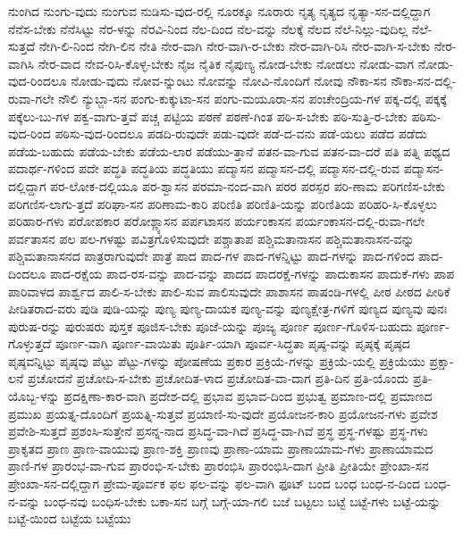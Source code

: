 {ನುಂಗಿದ
ನುಂಗು-ವುದು
ನುಂಗುವ
ನುಡಿಸು-ವುದ-ರಲ್ಲಿ
ನೂರಕ್ಕೂ
ನೂರಾರು
ನೃತ್ಯ
ನೃತ್ಯದ
ನೃತ್ಯಾ-ಸನ-ದಲ್ಲಿದ್ದಾಗ
ನೆನೆಸ-ಬೇಕು
ನೆನೆಸಿಟ್ಟು
ನೆರ-ಳನ್ನು
ನೆರವಿ-ನಿಂದ
ನೆಲ-ದಿಂದ
ನೆಲ-ವನ್ನು
ನೆಲಕ್ಕೆ
ನೆಲದ
ನೆಲೆ-ನಿಲ್ಲು-ವುದಿಲ್ಲ
ನೆಲೆ-ಸುತ್ತದೆ
ನೇಗಿ-ಲಿ-ನಿಂದ
ನೇಗಿ-ಲಿನ
ನೇತಿ
ನೇರ-ವಾಗಿ
ನೇರ-ವಾಗಿ-ರ-ಬೇಕು
ನೇರ-ವಾಗಿ-ರಿಸಿ
ನೇರ-ವಾಗಿ-ಸ-ಬೇಕು
ನೇರ-ವಾಗಿಸಿ
ನೇರ-ವಾದ
ನೇವ-ರಿಸಿ-ಕೊಳ್ಳ-ಬೇಕು
ನೈಜ
ನೈತಿಕ
ನೈಪುಣ್ಯ
ನೋಡ-ಬೇಕು
ನೋಡಲು
ನೋಡು-ವಾಗ
ನೋಡು-ವುದ-ರಿಂದಲೂ
ನೋಡು-ವುದು
ನೋವ-ನ್ನುಂಟು
ನೋವನ್ನು
ನೋವಿ-ನೊಂದಿಗೆ
ನೋವು
ನೌಕಾ-ಸನ
ನೌಕಾ-ಸನ-ದಲ್ಲಿ-ರುವಾ-ಗಲೇ
ನೌಲಿ
ನ್ಯುಬ್ಜಾ-ಸನ
ಪಂಗು-ಕುಕ್ಕುಟಾ-ಸನ
ಪಂಗು-ಮಯೂರಾ-ಸನ
ಪಂಚೇಂದ್ರಿಯ-ಗಳ
ಪಕ್ಕ-ದಲ್ಲಿ
ಪಕ್ಕಕ್ಕೆ
ಪಕ್ಕೆಲು-ಬು-ಗಳ
ಪಕ್ವ-ವಾಗು-ತ್ತವೆ
ಪಚ್ಚ
ಪಟ್ಟಿಯ
ಪಠಣೆ
ಪಠಣೆ-ಗಿಂತ
ಪಠಿ-ಸ-ಬೇಕು
ಪಠಿ-ಸುತ್ತಿ-ರ-ಬೇಕು
ಪಠಿಸು-ವುದ-ರಿಂದ
ಪಠಿಸು-ವುದ-ರಿಂದಲೂ
ಪಡದಿ-ರುವುದೇ
ಪಡು-ವುದೇ
ಪಡೆ-ದ-ವನು
ಪಡೆ-ಯಲು
ಪಡೆದ
ಪಡೆದು
ಪಡೆಯ-ಬಹುದು
ಪಡೆಯ-ಬೇಕು
ಪಡೆಯ-ಲಾರ
ಪಡೆಯು-ತ್ತಾನೆ
ಪತನ-ವಾ-ಗುವ
ಪತನ-ವಾ-ದರೆ
ಪತಿ
ಪತ್ನಿ
ಪಥ್ಯದ
ಪದಾರ್ಥ-ಗಳಿಂದ
ಪದೇ
ಪದ್ಧತಿ
ಪದ್ಧತಿಯ
ಪದ್ಧತಿಯು
ಪದ್ಮಾಸನ
ಪದ್ಮಾಸನ-ದಲ್ಲಿ
ಪದ್ಮಾಸನ-ದಲ್ಲಿ-ರುವ
ಪದ್ಮಾಸನ-ದಲ್ಲಿದ್ದಾಗ
ಪರ-ಲೋಕ-ದಲ್ಲಿಯೂ
ಪರ-ಶ್ವಾಸನ
ಪರಮಾ-ನಂದ-ವಾಗಿ
ಪರರ
ಪರಸ್ಪರ
ಪರಿ-ಣಾಮ
ಪರಿಗಣಿಸ-ಬೇಕು
ಪರಿಗಣಿಸ-ಲಾಗು-ತ್ತದೆ
ಪರಿಘಾ-ಸನ
ಪರಿಣಾಮ-ಕಾರಿ
ಪರಿಣಿತಿ
ಪರಿಣಿತಿ-ಯನ್ನು
ಪರಿಣಿತಿಯ
ಪರಿಹರಿ-ಸಿ-ಕೊಳ್ಳಲು
ಪರಿಹಾರ-ಗಳು
ಪರೋಪಕಾರ
ಪರೋಶ್ಣ್ಯಾಸನ
ಪರ್ಪಟಾಸನ
ಪರ್ಯಂಕಾಸನ
ಪರ್ಯಂಕಾಸನ-ದಲ್ಲಿ-ರುವಾ-ಗಲೇ
ಪರ್ವತಾಸನ
ಪಲ
ಪಲ-ಗಳಷ್ಟು
ಪವಿತ್ರಗೊಳಿಸುವುದೇ
ಪಶ್ಚಾತಾಪ
ಪಶ್ಚಿಮತಾನಾಸನ
ಪಶ್ಚಿಮತಾನಾಸನ-ವನ್ನು
ಪಶ್ಚಿಮತಾನಾಸನದ
ಪಾತ್ರರಾಗುವುದೇ
ಪಾತ್ರೆ
ಪಾದ
ಪಾದ-ಗಳ
ಪಾದ-ಗಳನ್ನಿಟ್ಟು
ಪಾದ-ಗಳನ್ನು
ಪಾದ-ಗಳಿಂದ
ಪಾದ-ದಿಂದಲೂ
ಪಾದ-ರಕ್ಷೆಯ
ಪಾದ-ರಸ-ವನ್ನು
ಪಾದ-ವನ್ನು
ಪಾದದ
ಪಾದರಕ್ಷೆ-ಗಳನ್ನು
ಪಾದುಕಾಸನ
ಪಾದುಕೆ-ಗಳು
ಪಾಪ
ಪಾರಿವಾಳದ
ಪಾರ್ಶ್ವದ
ಪಾಲಿ-ಸ-ಬೇಕು
ಪಾಲಿ-ಸುವ
ಪಾಲಿಸುವುದೇ
ಪಾಶಾಸನ
ಪಾಷಂಡಿ-ಗಳಲ್ಲಿ
ಪೀಠ
ಪೀಠದ
ಪೀಠಿಕೆ
ಪೀಡಿತರಾದ-ವರು
ಪುಡಿ
ಪುಡಿ-ಯನ್ನು
ಪುಣ್ಯ
ಪುಣ್ಯ-ದಾಯಕ
ಪುಣ್ಯ-ವನ್ನು
ಪುಣ್ಯಕ್ಷೇತ್ರ-ಗಳಿಗೆ
ಪುಣ್ಯದ
ಪುಣ್ಯವು
ಪುನಃ
ಪುರುಷ-ರನ್ನು
ಪುರುಷರು
ಪುಸ್ತಕ
ಪೂಜಿಸ-ಬೇಕು
ಪೂಜೆ-ಯನ್ನು
ಪೂಜ್ಯ
ಪೂರ್ಣ
ಪೂರ್ಣ-ಗೊಳಿಸ-ಬಹುದು
ಪೂರ್ಣ-ಗೊಳ್ಳುತ್ತದೆ
ಪೂರ್ಣ-ವಾಗಿ
ಪೂರ್ಣ-ವಾಯಿತು
ಪೂರ್ತಿ-ಯಾಗಿ
ಪೂರ್ವ-ಸಿದ್ಧತಾ
ಪೃಷ್ಠ-ವನ್ನು
ಪೃಷ್ಠಕ್ಕೆ
ಪೃಷ್ಠದ
ಪೃಷ್ಠವನ್ನಿಟ್ಟು
ಪೃಷ್ಠವು
ಪೆಟ್ಟು
ಪೆಟ್ಟು-ಗಳನ್ನು
ಪೋಷಣೆಯ
ಪ್ರಕಾರ
ಪ್ರಕ್ರಿಯೆ-ಗಳನ್ನು
ಪ್ರಕ್ರಿಯೆ-ಯಲ್ಲಿ
ಪ್ರಕ್ರಿಯೆಯು
ಪ್ರಕ್ಷಾ-ಲನೆ
ಪ್ರಚೋದನೆ
ಪ್ರಚೋದಿ-ಸ-ಬೇಕು
ಪ್ರಚೋದಿತ-ಳಾದ
ಪ್ರಚೋದಿತ-ವಾ-ದಾಗ
ಪ್ರತಿ-ದಿನ
ಪ್ರತಿ-ಯೊಂದು
ಪ್ರತಿ-ಯೊಬ್ಬ-ಳನ್ನು
ಪ್ರದಕ್ಷಿಣಾ-ಕಾರ-ವಾಗಿ
ಪ್ರದೇಶ-ದಲ್ಲಿ
ಪ್ರಭಾವ
ಪ್ರಭಾವ-ದಿಂದ
ಪ್ರಭುತ್ವ
ಪ್ರಮಾಣ-ದಲ್ಲಿ
ಪ್ರಮಾಣದ
ಪ್ರಮುಖ
ಪ್ರಯತ್ನ-ದೊಂದಿಗೆ
ಪ್ರಯತ್ನಿ-ಸುತ್ತವೆ
ಪ್ರಯಾಣಿ-ಸು-ವುದೇ
ಪ್ರಯೋಜನ-ಕಾರಿ
ಪ್ರಯೋಜನ-ಗಳು
ಪ್ರವೇಶ
ಪ್ರವೇಶಿ-ಸುತ್ತದೆ
ಪ್ರಶಂಸಿ-ಸುತ್ತೇನೆ
ಪ್ರಸನ್ನ-ನಾದ
ಪ್ರಸಿದ್ಧ-ವಾ-ಗಿದೆ
ಪ್ರಸಿದ್ಧ-ವಾ-ಗಿವೆ
ಪ್ರಸ್ಥ
ಪ್ರಸ್ಥ-ಗಳಷ್ಟು
ಪ್ರಸ್ಥ-ಗಳು
ಪ್ರಾಕೃತದ
ಪ್ರಾಣ
ಪ್ರಾಣ-ವಾಯುವು
ಪ್ರಾಣ-ಶಕ್ತಿ
ಪ್ರಾಣವು
ಪ್ರಾಣಾ-ಯಾಮ
ಪ್ರಾಣಾಯಾಮ-ಗಳು
ಪ್ರಾಣಾಯಾಮದ
ಪ್ರಾಣಿ-ಗಳ
ಪ್ರಾರಂಭ-ವಾ-ಗುವ
ಪ್ರಾರಂಭಿ-ಸ-ಬೇಕು
ಪ್ರಾರಂಭಿಸಿ
ಪ್ರಾರಂಭಿಸಿ-ದಾಗ
ಪ್ರೀತಿ
ಪ್ರೀತಿಯೇ
ಪ್ರೇಂಖಾ-ಸನ
ಪ್ರೇಂಖಾ-ಸನ-ದಲ್ಲಿದ್ದಾಗ
ಪ್ರೇಮ-ಪೂರ್ವಕ
ಫಲ
ಫಲ-ವನ್ನು
ಫಲ-ವಾಗಿ
ಫೂಟ್
ಬಂದ
ಬಂಧ
ಬಂಧ-ನ-ದಿಂದ
ಬಂಧ-ನ-ವನ್ನು
ಬಂಧ-ನವು
ಬಂಧಿಸ-ಬೇಕು
ಬಕಾ-ಸನ
ಬಗ್ಗೆ
ಬಗ್ಗೆ-ಯಾ-ಗಲಿ
ಬಜೆ
ಬಟ್ಟಲು
ಬಟ್ಟೆ
ಬಟ್ಟೆ-ಗಳು
ಬಟ್ಟೆ-ಯನ್ನು
ಬಟ್ಟೆ-ಯಿಂದ
ಬಟ್ಟೆಯ
ಬಟ್ಟೆಯು
}
